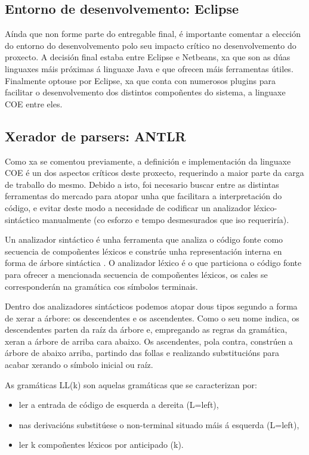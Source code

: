 \subsection{Entorno de desenvolvemento: Eclipse}
Aínda que non forme parte do entregable final, é importante comentar a elección
do entorno do desenvolvemento polo seu impacto crítico no desenvolvemento do
proxecto. A decisión final estaba entre Eclipse e Netbeans, xa que son as dúas
linguaxes máis próximas á linguaxe Java e que ofrecen máis ferramentas útiles.
Finalmente optouse por Eclipse\cite{eclipse}, xa que conta con numerosos plugins
para facilitar o desenvolvemento dos distintos compoñentes do sistema, a linguaxe
COE entre eles.

\subsection{Xerador de parsers: ANTLR}
Como xa se comentou previamente, a definición e implementación da linguaxe COE é
un dos aspectos críticos deste proxecto, requerindo a maior parte da carga de
traballo do mesmo. Debido a isto, foi necesario buscar entre as distintas
ferramentas do mercado para atopar unha que facilitara a interpretación do
código, e evitar deste modo a necesidade de codificar un analizador
léxico-sintáctico manualmente (co esforzo e tempo desmesurados que iso
requeriría).
\par
Un analizador sintáctico é unha ferramenta que analiza o código fonte como
secuencia de compoñentes léxicos e constrúe unha representación interna en forma
de árbore sintáctica \cite{compiladores}. O analizador léxico é o que
particiona o código fonte para ofrecer a mencionada secuencia de compoñentes
léxicos, os cales se corresponderán na gramática cos símbolos terminais.
\par
Dentro dos analizadores sintácticos podemos atopar dous tipos segundo a forma
de xerar a árbore: os descendentes e os ascendentes. Como o seu nome indica, os
descendentes parten da raíz da árbore e, empregando as regras da gramática,
xeran a árbore de arriba cara abaixo. Os ascendentes, pola contra, constrúen a
árbore de abaixo arriba, partindo das follas e realizando substitucións para
acabar xerando o símbolo inicial ou raíz.
\par
As gramáticas LL(k) son aquelas gramáticas que se caracterizan por:
\begin{itemize}
  \item ler a entrada de código de esquerda a dereita (L=left),
  \item nas derivacións substitúese o non-terminal situado máis á esquerda (L=left),
  \item ler k compoñentes léxicos por anticipado (k).
\end{itemize}
